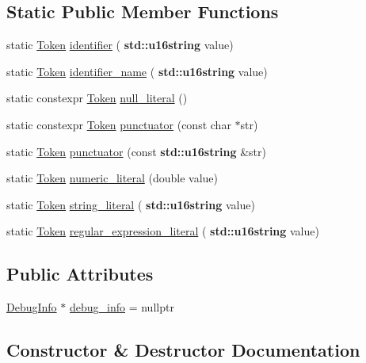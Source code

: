 \subsection*{Static Public Member Functions}
\begin{DoxyCompactItemize}
\item 
static \hyperlink{class_token}{Token} \hyperlink{class_token_af8cc69259b72cb8fb6f86da202564f15}{identifier} (\textbf{ std\+::u16string} value)
\item 
static \hyperlink{class_token}{Token} \hyperlink{class_token_ab97eb94f13e337e95b9a31a1956085ed}{identifier\+\_\+name} (\textbf{ std\+::u16string} value)
\item 
static constexpr \hyperlink{class_token}{Token} \hyperlink{class_token_af892768a64f034c6d941281fd7d6b758}{null\+\_\+literal} ()
\item 
static constexpr \hyperlink{class_token}{Token} \hyperlink{class_token_af63a6600ca9c654e40bea24483b2226e}{punctuator} (const char $\ast$str)
\item 
static \hyperlink{class_token}{Token} \hyperlink{class_token_a958d66fdb60bf55bc8ac8c4ea197e8b8}{punctuator} (const \textbf{ std\+::u16string} \&str)
\item 
static \hyperlink{class_token}{Token} \hyperlink{class_token_a6b30fa87c5bbd0c0b7b0e7b4344eeb8b}{numeric\+\_\+literal} (double value)
\item 
static \hyperlink{class_token}{Token} \hyperlink{class_token_a2fcf0ef9b36f5dec4ddc654aebd943ce}{string\+\_\+literal} (\textbf{ std\+::u16string} value)
\item 
static \hyperlink{class_token}{Token} \hyperlink{class_token_a04cbc6f06b61c2297af210b5dc0f730b}{regular\+\_\+expression\+\_\+literal} (\textbf{ std\+::u16string} value)
\end{DoxyCompactItemize}
\subsection*{Public Attributes}
\begin{DoxyCompactItemize}
\item 
\hyperlink{struct_token_1_1_debug_info}{Debug\+Info} $\ast$ \hyperlink{class_token_addc71bf112cf6013bc9f9e05bcaa5b5e}{debug\+\_\+info} = nullptr
\end{DoxyCompactItemize}


\subsection{Constructor \& Destructor Documentation}
\mbox{\label{class_token_a5fcfb5de8c671eb8c4b5acaf13e3e67c}} 

